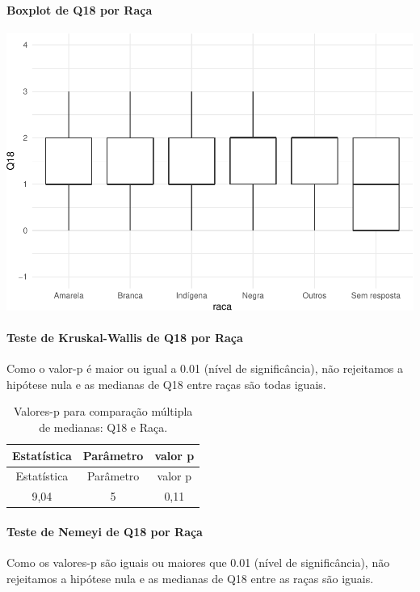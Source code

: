 \documentclass[]{article}
\let\oldparagraph\paragraph
\renewcommand{\paragraph}[1]{\oldparagraph{#1}\mbox{}}
\begin{document}
\hypertarget{boxplot-de-q18-por-rauxe7a}{%
\paragraph{Boxplot de Q18 por Raça}\label{boxplot-de-q18-por-rauxe7a}}

\begin{center}\includegraphics[width=0.75\linewidth]{relatorio_covid19_files/figure-latex/unnamed-chunk-283-1} \end{center}

\hypertarget{teste-de-kruskal-wallis-de-q18-por-rauxe7a}{%
\paragraph{Teste de Kruskal-Wallis de Q18 por Raça}\label{teste-de-kruskal-wallis-de-q18-por-rauxe7a}}

Como o valor-p é maior ou igual a 0.01 (nível de significância), não rejeitamos a hipótese nula e as medianas de Q18 entre raças são todas iguais.

\begin{longtable}[]{@{}ccc@{}}
\caption{\label{tab:unnamed-chunk-285}Valores-p para comparação múltipla de medianas: Q18 e Raça.}\tabularnewline
\toprule
Estatística & Parâmetro & valor p\tabularnewline
\midrule
\endfirsthead
\toprule
Estatística & Parâmetro & valor p\tabularnewline
\midrule
\endhead
9,04 & 5 & 0,11\tabularnewline
\bottomrule
\end{longtable}

\hypertarget{teste-de-nemeyi-de-q18-por-rauxe7a}{%
\paragraph{Teste de Nemeyi de Q18 por Raça}\label{teste-de-nemeyi-de-q18-por-rauxe7a}}

Como os valores-p são iguais ou maiores que 0.01 (nível de significância), não rejeitamos a hipótese nula e as medianas de Q18 entre as raças são iguais.
\end{document}
